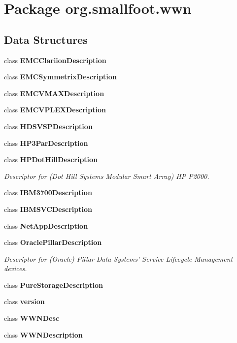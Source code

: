 \section{Package org.\-smallfoot.\-wwn}
\label{namespaceorg_1_1smallfoot_1_1wwn}
\subsection*{Data Structures}
\begin{DoxyCompactItemize}
\item 
class {\bf E\-M\-C\-Clariion\-Description}
\item 
class {\bf E\-M\-C\-Symmetrix\-Description}
\item 
class {\bf E\-M\-C\-V\-M\-A\-X\-Description}
\item 
class {\bf E\-M\-C\-V\-P\-L\-E\-X\-Description}
\item 
class {\bf H\-D\-S\-V\-S\-P\-Description}
\item 
class {\bf H\-P3\-Par\-Description}
\item 
class {\bf H\-P\-Dot\-Hill\-Description}
\begin{DoxyCompactList}\small\item\em Descriptor for (Dot Hill Systems Modular Smart Array) H\-P P2000. \end{DoxyCompactList}\item 
class {\bf I\-B\-M3700\-Description}
\item 
class {\bf I\-B\-M\-S\-V\-C\-Description}
\item 
class {\bf Net\-App\-Description}
\item 
class {\bf Oracle\-Pillar\-Description}
\begin{DoxyCompactList}\small\item\em Descriptor for (Oracle) Pillar Data Systems' Service Lifecycle Management devices. \end{DoxyCompactList}\item 
class {\bf Pure\-Storage\-Description}
\item 
class {\bf version}
\item 
class {\bf W\-W\-N\-Desc}
\item 
class {\bf W\-W\-N\-Description}
\end{DoxyCompactItemize}
